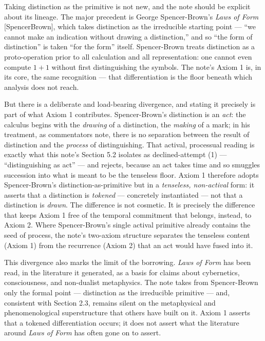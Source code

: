 \documentclass[
]{article}
\begin{document}
Taking distinction as the primitive is not new, and the note should be
explicit about its lineage. The major precedent is George
Spencer-Brown's \emph{Laws of Form} {[}SpencerBrown{]}, which takes
distinction as the irreducible starting point --- ``we cannot make an
indication without drawing a distinction,'' and so ``the form of
distinction'' is taken ``for the form'' itself. Spencer-Brown treats
distinction as a proto-operation prior to all calculation and all
representation: one cannot even compute \(1+1\) without first
distinguishing the symbols. The note's Axiom 1 is, in its core, the same
recognition --- that differentiation is the floor beneath which analysis
does not reach.

But there is a deliberate and load-bearing divergence, and stating it
precisely is part of what Axiom 1 contributes. Spencer-Brown's
distinction is an \emph{act}: the calculus begins with the
\emph{drawing} of a distinction, the \emph{making} of a mark; in his
treatment, as commentators note, there is no separation between the
result of distinction and the \emph{process} of distinguishing. That
actival, processual reading is exactly what this note's Section 5.2
isolates as declined-attempt (1) --- ``distinguishing as act'' --- and
rejects, because an act takes time and so smuggles succession into what
is meant to be the tenseless floor. Axiom 1 therefore adopts
Spencer-Brown's distinction-as-primitive but in a \emph{tenseless,
non-actival} form: it asserts that a distinction is \emph{tokened} ---
concretely instantiated --- not that a distinction is \emph{drawn}. The
difference is not cosmetic. It is precisely the difference that keeps
Axiom 1 free of the temporal commitment that belongs, instead, to Axiom
2. Where Spencer-Brown's single actival primitive already contains the
seed of process, the note's two-axiom structure separates the tenseless
content (Axiom 1) from the recurrence (Axiom 2) that an act would have
fused into it.

This divergence also marks the limit of the borrowing. \emph{Laws of
Form} has been read, in the literature it generated, as a basis for
claims about cybernetics, consciousness, and non-dualist metaphysics.
The note takes from Spencer-Brown only the formal point --- distinction
as the irreducible primitive --- and, consistent with Section 2.3,
remains silent on the metaphysical and phenomenological superstructure
that others have built on it. Axiom 1 asserts that a tokened
differentiation occurs; it does not assert what the literature around
\emph{Laws of Form} has often gone on to assert.
\end{document}

